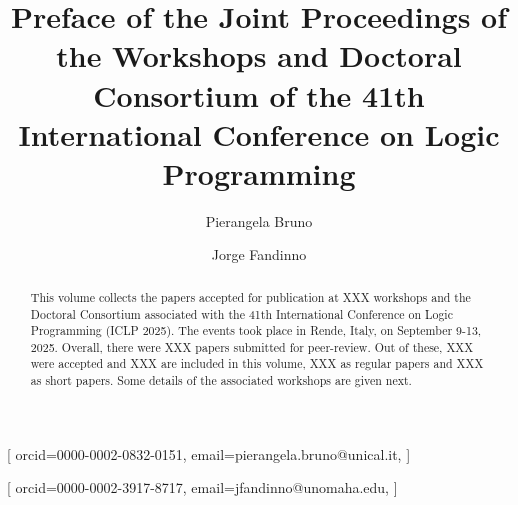 \documentclass[
]{ceurart}
\begin{document}


\title{Preface of the Joint Proceedings of the Workshops and Doctoral Consortium of the 41th International Conference on Logic Programming}


\author[1]{Pierangela Bruno}[%
orcid=0000-0002-0832-0151,
email=pierangela.bruno@unical.it,
]
\address[2]{University of Calabria, Italy}


\author[2]{Jorge Fandinno}[%
orcid=0000-0002-3917-8717,
email=jfandinno@unomaha.edu,
]
\address[2]{University of Nebraska Omaha, USA}

\def\changemargin#1#2{\list{}{\rightmargin#2\leftmargin#1}\item[]}
\let\endchangemargin=\endlist 


\newcommand{\workshop}[3]{\section{#2}\vspace{-8pt}\begin{changemargin}{19pt}{8pt} 
\rm\normalsize\it #1 #2 (#3)\end{changemargin}}


\begin{abstract}
This volume collects the papers accepted for publication at XXX workshops and the Doctoral Consortium associated with the 41th International Conference on Logic Programming (ICLP 2025).
%
The events took place in Rende, Italy, on September 9-13, 2025.
%
Overall, there were XXX papers submitted for peer-review.
%
Out of these, XXX were accepted and XXX are included in this volume, XXX as regular papers and XXX as short papers. Some details of the associated workshops are given next.
\end{abstract}

\maketitle
\end{document}
